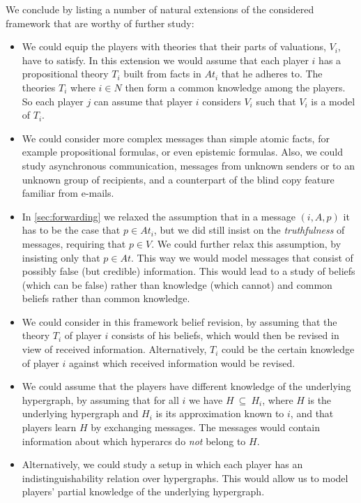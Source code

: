 \documentclass{article}
\newcounter{#1}
\newcommand{\sse}{\mbox{$\:\subseteq\:$}}
\newcommand{\bits}{\ensuremath{At}\xspace}
\begin{document}
We conclude by listing a number of natural extensions of the considered framework 
that are worthy of further study:
\begin{itemize}

\item We could equip the players with theories that their parts of
  valuations, $V_i$, have to satisfy.  In this extension we would
  assume that each player $i$ has a propositional theory $T_i$
  built from facts in $At_i$ that he adheres to. The theories $T_i$
  where $i \in N$ then form a common knowledge among the players. So
  each player $j$ can assume that player $i$ considers $V_i$ such that
  $V_i$ is a model of $T_i$.

\item We could consider more complex messages than simple atomic
facts, for example propositional formulas, or even
epistemic formulas.
Also, we could study asynchronous communication,
messages from unknown senders or to an unknown group of recipients,
and a counterpart of the blind copy feature familiar from e-mails.
  
\item In \cref{sec:forwarding} we relaxed the assumption that in a
  message $(i,A,p)$ it has to be the case that $p \in \bits_i$, but we
  did still insist on the \emph{truthfulness} of messages, requiring
  that $p \in V$.  We could further relax this assumption, by
  insisting only that $p \in At$. This way we would model messages
  that consist of possibly false (but credible) information.  This
  would lead to a study of beliefs (which can be false) rather than
  knowledge (which cannot) and common beliefs rather than common
  knowledge.
  
\item We could consider in this framework belief revision, by assuming
  that the theory $T_i$ of player $i$ consists of his beliefs, which
  would then be revised in view of received information.
  Alternatively, $T_i$ could be the certain knowledge of player $i$
  against which received information would be revised.
  
\item We could assume that the players have different knowledge of the
  underlying hypergraph, by assuming that for all $i$ we have $H \sse
  H_i$, where $H$ is the underlying hypergraph and $H_i$ is its
  approximation known to $i$, and that players learn $H$ by exchanging
  messages.  The messages would contain information about which
  hyperarcs do \emph{not} belong to $H$.
\item Alternatively, we could study a setup in which each player has
an indistinguishability relation over hypergraphs. This
would allow us to model players' partial knowledge of the
underlying hypergraph.
\end{itemize}
\end{document}
